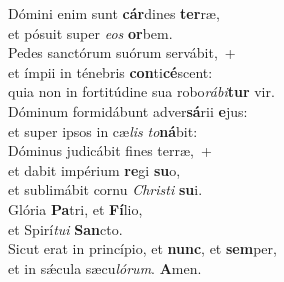 \oddverse Dómini enim sunt \textbf{cár}dines \textbf{ter}ræ,~\*\\
\oddverse et pósuit super \textit{e}\textit{os} \textbf{or}bem.\\
\evenverse Pedes sanctórum suórum servábit,~+\\
\evenverse  et ímpii in ténebris \textbf{con}ti\textbf{cé}scent:~\*\\
\evenverse quia non in fortitúdine sua robo\textit{rá}\textit{bi}\textbf{tur} vir.\\
\oddverse Dóminum formidábunt adver\textbf{sá}rii \textbf{e}jus:~\*\\
\oddverse et super ipsos in cæ\textit{lis} \textit{to}\textbf{ná}bit:\\
\evenverse Dóminus judicábit fines terræ,~+\\
\evenverse  et dabit impérium \textbf{re}gi \textbf{su}o,~\*\\
\evenverse et sublimábit cornu \textit{Chri}\textit{sti} \textbf{su}i.\\
\oddverse Glória \textbf{Pa}tri, et \textbf{Fí}lio,~\*\\
\oddverse et Spirí\textit{tu}\textit{i} \textbf{San}cto.\\
\evenverse Sicut erat in princípio, et \textbf{nunc}, et \textbf{sem}per,~\*\\
\evenverse et in sǽcula sæcu\textit{ló}\textit{rum}. \textbf{A}men.\\
